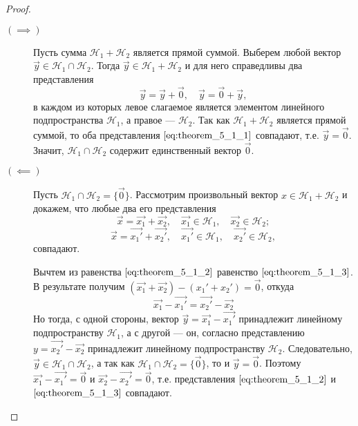 \begin{proof}~
    \begin{description}
        \item[$(\implies)$] 
            Пусть сумма $\mathcal{H}_1 + \mathcal{H}_2$ является прямой суммой. Выберем любой вектор $\vec{y} \in \mathcal{H}_1 \cap \mathcal{H}_2$. Тогда $\vec{y} \in \mathcal{H}_1 + \mathcal{H}_2$ и для него справедливы два представления
            \begin{equation}
                \vec{y} = \vec{y} + \vec{0}, \quad \vec{y} = \vec{0} + \vec{y},
                \label{eq:theorem_5_1_1}
            \end{equation}
            в каждом из которых левое слагаемое является элементом линейного подпространства $\mathcal{H}_1$, а правое — $\mathcal{H}_2$. Так как $\mathcal{H}_1 + \mathcal{H}_2$ является прямой суммой, то оба представления $\eqref{eq:theorem_5_1_1}$ совпадают, т.е. $\vec{y} = \vec{0}$. Значит, $\mathcal{H}_1 \cap \mathcal{H}_2$ содержит единственный вектор $\vec{0}$.

        \item[$(\impliedby)$]
            Пусть $\mathcal{H}_1 \cap \mathcal{H}_2 = \{\vec{0}\}$. Рассмотрим произвольный вектор $x \in \mathcal{H}_1 + \mathcal{H}_2$ и докажем, что любые два его представления
            \begin{equation}
                \vec{x} = \vec{x_1} + \vec{x_2}, \quad \vec{x_1} \in \mathcal{H}_1, \quad \vec{x_2} \in \mathcal{H}_2;
                \label{eq:theorem_5_1_2}
            \end{equation}
            \begin{equation}
                \vec{x} = \vec{x_1'} + \vec{x_2'}, \quad \vec{x_1'} \in \mathcal{H}_1, \quad \vec{x_2'} \in \mathcal{H}_2,
                \label{eq:theorem_5_1_3}
            \end{equation}
            совпадают.

            Вычтем из равенства $\eqref{eq:theorem_5_1_2}$ равенство $\eqref{eq:theorem_5_1_3}$. В результате получим $(\vec{x_1} + \vec{x_2}) - (x_1' + x_2') = \vec{0}$, откуда
            $$\vec{x_1} - \vec{x_1'} = \vec{x_2'} - \vec{x_2}$$
            Но тогда, с одной стороны, вектор $\vec{y} = \vec{x_1} - \vec{x_1'}$ принадлежит линейному подпространству $\mathcal{H}_1$, а с другой — он, согласно представлению $y = \vec{x_2'} - \vec{x_2}$ принадлежит линейному подпространству $\mathcal{H}_2$. Следовательно, $\vec{y} \in \mathcal{H}_1 \cap \mathcal{H}_2$, а так как $\mathcal{H}_1 \cap \mathcal{H}_2 = \{\vec{0}\}$, то и $\vec{y} = \vec{0}$. Поэтому $\vec{x_1} - \vec{x_1'} = \vec{0}$ и $\vec{x_2} - \vec{x_2'} = \vec{0}$, т.е. представления $\eqref{eq:theorem_5_1_2}$ и $\eqref{eq:theorem_5_1_3}$ совпадают.
    \end{description}
\end{proof}
